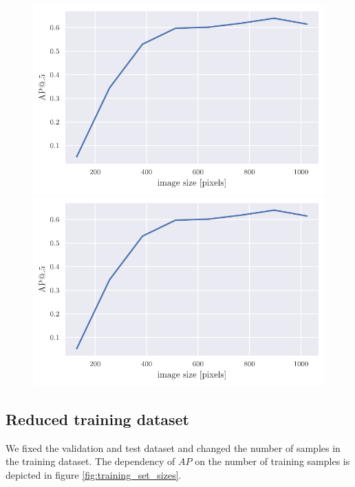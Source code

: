 \begin{figure}
    \begin{floatrow}[2]
        \includegraphics[width=0.5\linewidth]{images/img_size_dependency.pdf}\qquad
        \includegraphics[width=0.5\linewidth]{images/img_size_dependency.pdf}\qquad
    \end{floatrow}
\end{figure}

\subsection{Reduced training dataset}
We fixed the validation and test dataset and changed the number of samples in the training dataset. The dependency of $AP$ on the number of training samples is depicted in figure \ref{fig:training_set_sizes}.

